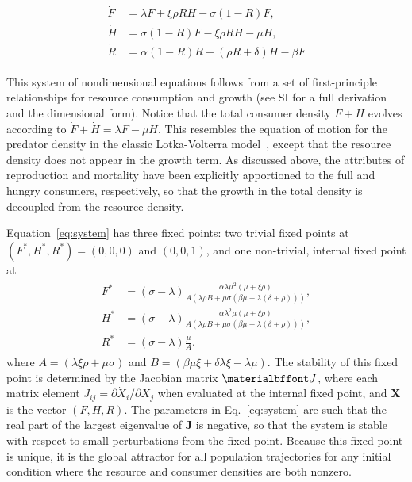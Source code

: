 \documentclass{pnastwo}
\begin{document}
\begin{article}
\begin{align}
\label{eq:system}
\begin{split}
\dot{F} &= \lambda F + \xi \rho RH - \sigma \left(1-R\right)F,  \\
\dot{H} &= \sigma \left(1-R\right)F - \xi \rho RH - \mu H,  \\
\dot{R} &= \alpha \left(1-R\right)R -\left(\rho R+\delta\right)H-\beta F
\end{split}
\end{align}

This system of nondimensional equations follows from a set of first-principle relationships for resource consumption and growth (see SI for a full derivation and the dimensional form).
Notice that the total consumer density $F+H$ evolves according to $\dot{F}+\dot{H}=\lambda F-\mu H$.
This resembles the equation of motion for the predator density in the classic Lotka-Volterra model~\cite{murray2011mathematical}, except that the resource density does not appear in the growth term.
As discussed above, the attributes of reproduction and mortality have been explicitly apportioned to the full and hungry consumers, respectively, so that the growth in the total density is decoupled from the resource density.



Equation~\eqref{eq:system} has three fixed points: two trivial fixed points at $(F^*,H^*,R^*)=(0,0,0)$ and $(0,0,1)$, and one non-trivial, internal fixed point at
\begin{align}
\label{eq:ss}
\begin{split}
F^* &= (\sigma-\lambda)\frac{ \alpha  \lambda  \mu ^2  (\mu +\xi  \rho )}{A (\lambda  \rho  B+\mu  \sigma  (\beta  \mu +\lambda  (\delta +\rho )))}, \\
H^* &= (\sigma-\lambda)\frac{ \alpha  \lambda ^2 \mu  (\mu +\xi  \rho )}{A (\lambda  \rho  B+\mu  \sigma  (\beta  \mu +\lambda  (\delta +\rho )))}, \\
R^* &= (\sigma - \lambda)\frac{\mu  }{A}.
\end{split}
\end{align}
where $A=(\lambda  \xi  \rho +\mu  \sigma )$ and $B=(\beta  \mu  \xi +\delta  \lambda  \xi -\lambda  \mu )$. The stability of this fixed point is determined by the Jacobian matrix $\bf J$, where each matrix element $J_{ij}=\partial{\dot X_i}/\partial{X_j}$ when evaluated at the internal fixed point, and $\mathbf{X}$ is the vector $(F,H,R)$.
The parameters in Eq.~\eqref{eq:system} are such that the real part of the largest eigenvalue of $\mathbf{J}$ is negative, so that the system is stable with respect to small perturbations from the fixed point.
Because this fixed point is unique, it is the global attractor for all population trajectories for any initial condition where the resource and consumer densities are both nonzero.





\end{article}
\end{document}
